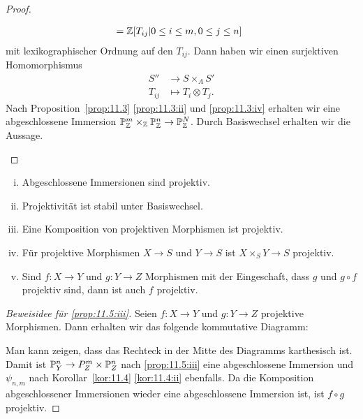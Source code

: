 \begin{kor}
\begin{proof}
\begin{enumerate}[i)]
\begin{align*}
				&\phantom{:}= \Z[T_{ij} | 0 \leq i \leq m, 0 \leq j \leq n ]
			\end{align*}
			mit lexikographischer Ordnung auf den $T_{ij}$. Dann haben wir einen surjektiven Homomorphismus
			\begin{align*}
				S'' &\to S \times_A S'\\
				T_{ij} & \mapsto T_i \otimes T_j .
			\end{align*}
			Nach Proposition~\ref{prop:11.3} \ref{prop:11.3:ii} und \ref{prop:11.3:iv} erhalten wir eine abgeschlossene Immersion $\P_\Z^m \times_\Z \P_\Z^n \to \P_\Z^N$. Durch Basiswechsel erhalten wir die Aussage.
		\end{enumerate}
	\end{proof}
\end{kor}

\begin{prop}
	\label{prop:11.5}
	\begin{enumerate}[i)]
	\item\label{prop:11.5:i} Abgeschlossene Immersionen sind projektiv.
	\item\label{prop:11.5:ii} Projektivität ist stabil unter Basiswechsel.
	\item\label{prop:11.5:iii} Eine Komposition von projektiven Morphismen ist projektiv.
	\item\label{prop:11.5:iv} Für projektive Morphismen $X\to S$ und $Y \to S$ ist $X \times_S Y \to S$ projektiv.
	\item\label{prop:11.5:v} Sind $f \colon X \to Y$ und $g \colon Y \to Z$ Morphismen mit der Eingeschaft, dass $g$ und $g \circ f$ projektiv sind, dann ist auch $f$ projektiv.
	\end{enumerate}
	\begin{proof}[Beweisidee für \ref{prop:11.5:iii}] Seien $f \colon X \to Y$ und $g \colon Y \to Z$ projektive Morphismen. Dann erhalten wir das folgende kommutative Diagramm:
		\begin{center}
		\end{center}
		Man kann zeigen, dass das Rechteck in der Mitte des Diagramms karthesisch ist. Damit ist $\P_Y^n \to P_Z^m \times \P_Z^n$ nach \ref{prop:11.5:iii} eine abgeschlossene Immersion und $\psi_{n,m}$ nach Korollar~\ref{kor:11.4} \ref{kor:11.4:ii} ebenfalls. Da die Komposition abgeschlossener Immersionen wieder eine abgeschlossene Immersion ist, ist $f \circ g$ projektiv.
	\end{proof}
\end{prop}

